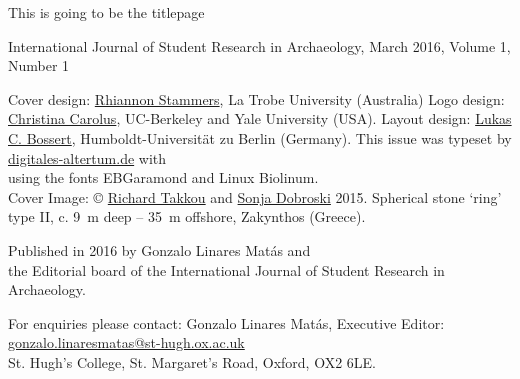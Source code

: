 	\begin{titlepage}
		
		This is going to be the titlepage
	\end{titlepage}	
\thispagestyle{empty}
\hfill
\vfill

\begin{footnotesize}
\noindent International Journal of Student Research in Archaeology,\newline
March 2016, Volume 1, Number 1\\
\vspace{2em}


\noindent Cover design: \href{https://latrobe.academia.edu/RhiannonStammers}{Rhiannon Stammers}, La Trobe University (Australia)\newline
\noindent Logo design: \href{hraf.yale.edu/about/staff/christina-carolus/}{Christina Carolus}, UC-Berkeley and Yale University (USA).\newline
\noindent Layout design: \href{https://hu-berlin.academia.edu/LukasCBossert}{Lukas C. Bossert}, Humboldt-Universität zu Berlin (Germany). \newline \indent This issue was typeset by \href{www.digitales-altertum.de}{digitales-altertum.de}  with \XeLaTeX\ \\ \indent using the fonts EBGaramond and {\sffamily Linux Biolinum}.\\
Cover Image: © \href{https://oxford.academia.edu/RichardTakkou}{Richard Takkou} and \href{https://st-andrews.academia.edu/SonjaDobroski}{Sonja Dobroski} 2015.\newline
\indent Spherical stone ‘ring’ type II, c. \SI{9}{\meter} deep – \SI{35}{\meter} offshore, Zakynthos (Greece). 
\vspace{2em}

\noindent Published in 2016 by Gonzalo Linares Matás and \\ the Editorial board of the International Journal of Student Research in Archaeology. 




\vspace{2em}






\noindent For enquiries please contact: Gonzalo Linares Matás, Executive Editor:\\ \href{mailto:gonzalo.linaresmatas@st-hugh.ox.ac.uk}{gonzalo.linaresmatas@st-hugh.ox.ac.uk}\\  St. Hugh’s College, St. Margaret’s Road, Oxford, OX2 6LE.


\end{footnotesize}
